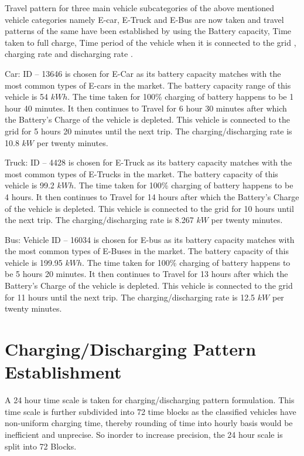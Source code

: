 	Travel pattern for three main vehicle subcategories of the above mentioned vehicle categories namely E-car, E-Truck and E-Bus are now taken and travel patterns of the same have been established by using the Battery capacity, Time taken to full charge, Time period of the vehicle when it is connected to the grid , charging rate and discharging rate \cite{evdata}.
	
	Car: ID – 13646 \cite{evdata} is chosen for E-Car as its battery capacity matches with the most common types of E-cars in the market. The
	battery capacity range of this vehicle is 54 $kWh$. The time taken for 100\% charging of battery
	happens to be 1 hour 40 minutes. It then continues to Travel for 6 hour 30 minutes after which the Battery's Charge of the vehicle is depleted. This vehicle is connected to the grid for 5 hours 20 minutes until the next trip. The charging/discharging rate is 10.8 $kW$ per twenty minutes.
	
	Truck: ID – 4428 \cite{evdata} is chosen for E-Truck as its battery capacity matches with the most common types of E-Trucks in the market. The
	battery capacity of this vehicle is 99.2 $kWh$. The time taken for 100\% charging of battery
	happens to be 4 hours. It then continues to Travel for 14 hours after which the Battery's Charge of the vehicle is depleted. This vehicle is connected to the grid for 10 hours until the next trip. The charging/discharging rate is 8.267 $kW$ per twenty minutes.
	
	Bus: Vehicle ID – 16034 \cite{evdata} is chosen for E-bus as its battery capacity matches with the most common types of E-Buses in the market. The
	battery capacity of this vehicle is 199.95 $kWh$. The time taken for 100\% charging of battery
	happens to be 5 hours 20 minutes. It then continues to Travel for 13 hours after which the Battery's Charge of the vehicle is depleted. This vehicle is connected to the grid for 11 hours until the next trip. The charging/discharging rate is 12.5 $kW$ per twenty minutes.
	



	\section{Charging/Discharging Pattern Establishment}
	
	A 24 hour time scale is taken for charging/discharging pattern formulation. This time scale is further subdivided into 72 time blocks as the classified vehicles have non-uniform charging time, thereby rounding of time into hourly basis would be inefficient and unprecise. So inorder to increase precision, the 24 hour scale is split into 72 Blocks.
	
